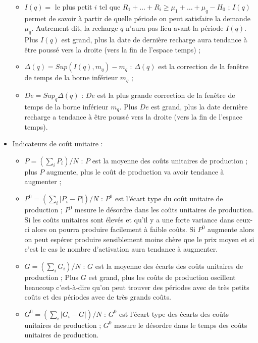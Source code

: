 \begin{itemize}[label=$\square$]
\begin{itemize}
\item	$I(q) =$ le plus petit $i$ tel que $R_1 + \dots + R_i \geq \mu_1 + \dots + \mu_q - H_0$ ; $I(q)$ permet de savoir à partir de quelle période on peut satisfaire la demande $\mu_q$. Autrement dit, la recharge $q$ n'aura pas lieu avant la période $I(q)$. Plus $I(q)$ est grand, plus la date de dernière recharge aura tendance à être poussé vers la droite (vers la fin de l'espace temps) ;
\item	$\Delta(q) = Sup(I(q), m_q) - m_q$ : $\Delta(q)$ est la correction de la fenêtre de temps de la borne inférieur $m_q$ ;
\item	$De = Sup_q \Delta(q)$ : $De$ est la plus grande correction de la fenêtre de temps de la borne inférieur $m_q$. Plus $De$ est grand, plus la date dernière recharge a tendance à être poussé vers la droite (vers la fin de l'espace temps).
\end{itemize} 

\item Indicateurs de coût unitaire :
\begin{itemize}
\item	$P = (\sum_i P_i)/N$ : $P$ est la moyenne des coûts unitaires de production ; plus $P$ augmente, plus le coût de production va avoir tendance à augmenter ; 
\item  $P^0 = (\sum_i |P_i- P|)/N$ : $P^0$ est l'écart type du coût unitaire de production ; $P^0$ mesure le désordre dans les coûts unitaires de production. Si les coûts unitaires sont élevés et qu'il y a une forte variance dans ceux-ci alors on pourra produire facilement à faible coûts. Si $P^0$ augmente alors on peut espérer produire sensiblement moins chère que le prix moyen et si c'est le cas le nombre d'activation aura tendance à augmenter.
\item	$G = (\sum_i G_i)/N$ : $G$ est la moyenne des écarts des coûts unitaires de production ; Plus $G$ est grand, plus les coûts de production oscillent beaucoup c'est-à-dire qu'on peut trouver des périodes avec de très petits coûts et des périodes avec de très grands coûts.
\item $G^0 = (\sum_i |G_i- G|)/N$ : $G^0$ est l'écart type des écarts des coûts unitaires de production ; $G^0$ mesure le désordre dans le temps des coûts unitaires de production.
\end{itemize}


\end{itemize}
